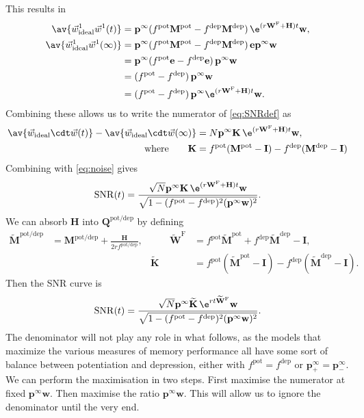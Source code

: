 \documentclass[12pt]{article}
\newcommand{\I}{\mathbf{I}}
\newcommand{\onev}{\mathbf{e}}
\newcommand{\MM}{\mathbf{Q}}
\newcommand{\pr}{\mathbf{p}}
\newcommand{\eq}{\pr^\infty}
\newcommand{\w}{\mathbf{w}}
\newcommand{\W}{\mathbf{W}}
\newcommand{\M}{\mathbf{M}}
\newcommand{\enc}{\mathbf{K}}
\newcommand{\frg}{\W^{\mathrm{F}}}
\newcommand{\pot}{^{\text{pot}}}
\newcommand{\dep}{^{\text{dep}}}
\newcommand{\potdep}{^{\text{pot/dep}}}
\renewcommand{\hom}{\mathbf{H}}
\newcommand{\Mh}{\widetilde{\M}}
\newcommand{\frgh}{\widetilde{\W}^{\mathrm{F}}}
\newcommand{\ench}{\widetilde{\enc}}
\newcommand{\syn}{\vec{w}}
\DeclareMathOperator{\SNR}{SNR}
\begin{document}
This results in
%
\begin{equation}\label{eq:overlapwt}
\begin{aligned}
  \av{\syn^1_\text{ideal}\syn^1(t)} &= \eq (f\pot\M\pot-f\dep\M\dep)\, \e^{(r\frg+\hom)t} \w, \\
  \av{\syn^1_\text{ideal}\syn^1(\infty)} &= \eq (f\pot\M\pot-f\dep\M\dep)\, \onev\eq \w \\
         &= \eq (f\pot\onev-f\dep\onev)\, \eq \w \\
         &=  (f\pot-f\dep)\, \eq \w \\
         &=  (f\pot-f\dep)\, \eq \e^{(r\frg+\hom)t} \w .
\end{aligned}
\end{equation}
%
Combining these allows us to write the numerator of \eqref{eq:SNRdef} as
%
\begin{equation}\label{eq:signal}
\begin{aligned}
  \av{\syn_\text{ideal}\cdt\syn(t)} - \av{\syn_\text{ideal}\cdt\syn(\infty)}
    &= N \eq \enc \, \e^{(r\frg+\hom)t} \w , \\
    \text{where} \qquad
  \enc &= f\pot(\M\pot-\I)-f\dep(\M\dep-\I)
\end{aligned}
\end{equation}
%
Combining with \eqref{eq:noise} gives
%
\begin{equation}\label{eq:SNRcurveExact}
  \SNR(t) = \frac{\sqrt{N} \eq \enc\,\e^{(r\frg+\hom)t}\w}
                 {\sqrt{1-(f\pot-f\dep)^2(\eq\w)^2}}.
\end{equation}
%
We can absorb $\hom$ into $\MM\potdep$ by defining
%
\begin{equation}\label{eq:absorbhom}
\begin{aligned}
  \Mh\potdep &= \M\potdep + \frac{\hom}{2rf\potdep},
  &\qquad
  \frgh &= f\pot\Mh\pot + f\dep\Mh\dep - \I,
  \\&&
  \ench &= f\pot(\Mh\pot-\I)-f\dep(\Mh\dep-\I).
\end{aligned}
\end{equation}
%
Then the SNR curve is
%
\begin{equation}\label{eq:SNRcurvehom}
  \SNR(t) = \frac{\sqrt{N}  \eq \ench \,\e^{rt\frgh}\w}
                 {\sqrt{1-(f\pot-f\dep)^2(\eq\w)^2}}.
\end{equation}
%
The denominator will not play any role in what follows, as the models that maximize the various measures of memory performance all have some sort of balance between potentiation and depression, either with $f\pot=f\dep$ or $\eq_+=\eq_-$.
We can perform the maximisation in two steps.
First maximise the numerator at fixed $\eq\w$.
Then maximise the ratio \wrt $\eq\w$.
This will allow us to ignore the denominator until the very end.
\end{document}
